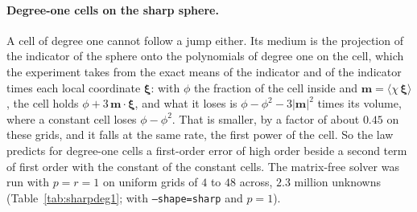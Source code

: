 \documentclass[11pt,a4paper]{article}
\begin{document}
\paragraph{Degree-one cells on the sharp sphere.} A cell of degree one cannot follow a jump either. Its
medium is the projection of the indicator of the sphere onto the polynomials of degree one on the cell,
which the experiment takes from the exact means of the indicator and of the indicator times each local
coordinate $\boldsymbol\xi$: with $\phi$ the fraction of the cell inside and
$\mathbf m=\langle\chi\,\boldsymbol\xi\rangle$, the cell holds $\phi+3\,\mathbf m\cdot\boldsymbol\xi$,
and what it loses is $\phi-\phi^2-3\lvert\mathbf m\rvert^2$ times its volume, where a constant cell loses
$\phi-\phi^2$. That is smaller, by a factor of about $0.45$ on these grids, and it falls at the same
rate, the first power of the cell. So the law predicts for degree-one cells a first-order error of high
order beside a second term of first order with the constant of the constant cells. The matrix-free
solver was run with $p=r=1$ on uniform grids of $4$ to $48$ across, $2.3$ million unknowns
(Table~\ref{tab:sharpdeg1};  with \texttt{--shape=sharp} and
$p=1$).
\end{document}
